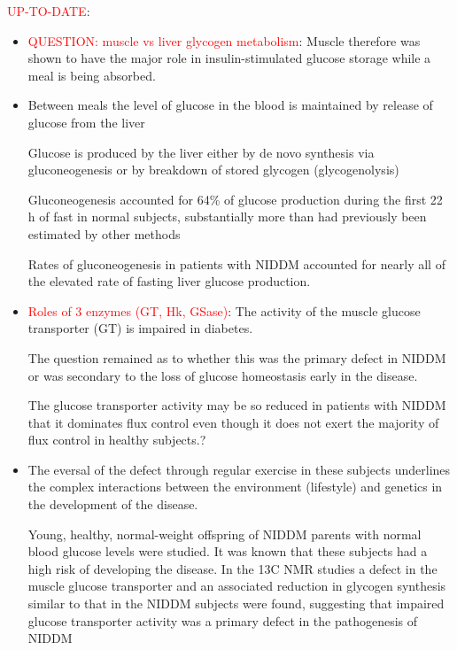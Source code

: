 \textcolor{red}{UP-TO-DATE}:
\begin{itemize}
  
  \item  \textcolor{red}{QUESTION: muscle vs liver glycogen metabolism}: Muscle
  therefore was shown to have the major role in insulin-stimulated glucose
  storage while a meal is being absorbed.
  
  
  \item Between meals the level of glucose in the blood is maintained by release
  of glucose from the liver
  
  Glucose is produced by the liver either by de novo synthesis via
  gluconeogenesis or by breakdown of stored glycogen (glycogenolysis)
  
  Gluconeogenesis accounted for 64\% of glucose production during the first 22 h
  of fast in normal subjects, substantially more than had previously been
  estimated by other methods
  
  Rates of gluconeogenesis in patients with NIDDM accounted for nearly all of
  the elevated rate of fasting liver glucose production.
  
  \item \textcolor{red}{Roles of 3 enzymes (GT, Hk, GSase)}: The activity of the
  muscle glucose transporter (GT) is impaired in diabetes.
  
  The question remained as to whether this was the primary defect in NIDDM or
  was secondary to the loss of glucose homeostasis early in the disease.
  
  The glucose transporter activity may be so reduced in patients with NIDDM that
  it dominates flux control even though it does not exert the majority of flux
  control in healthy subjects.?
  
  
  \item The eversal of the defect through regular exercise in these subjects
  underlines the complex interactions between the environment (lifestyle) and
  genetics in the development of the disease.
  
  Young, healthy, normal-weight offspring of NIDDM parents with normal blood
  glucose levels were studied.
  It was known that these subjects had a high risk of developing the disease.
  In the 13C NMR studies a defect in the muscle glucose transporter and an
  associated reduction in glycogen synthesis similar to that in the NIDDM
  subjects were found, suggesting that impaired glucose transporter activity was
  a primary defect in the pathogenesis of NIDDM
  

\end{itemize}
